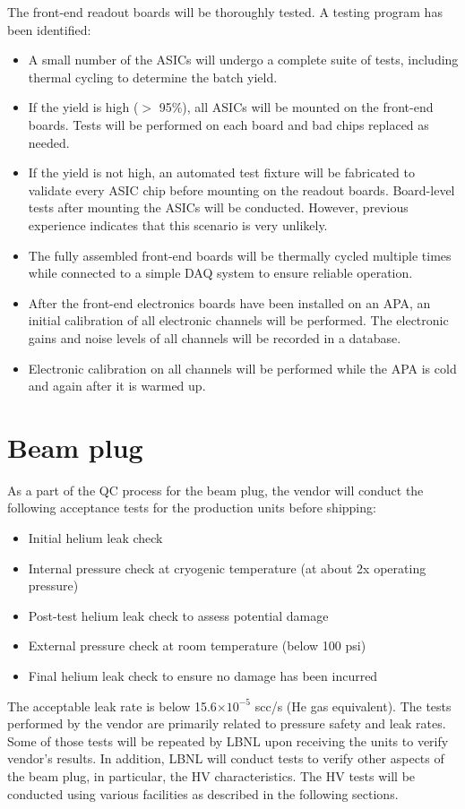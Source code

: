 The front-end readout boards will be thoroughly tested. A testing program has been identified:
\begin{itemize}
\item A small number of the ASICs will undergo a complete suite 
of tests, including thermal cycling to determine the batch yield.
\item If the yield is high ($>$ 95\%), all ASICs will be mounted 
on the front-end boards.
Tests will be performed on each board and bad chips replaced as needed.
\item If the yield is not high, an automated test fixture will be 
fabricated to validate every ASIC chip before mounting on the readout boards.
Board-level tests after mounting the ASICs will be conducted.
However, previous experience indicates that this scenario is very unlikely.
\item The fully assembled front-end boards will be thermally cycled multiple times while connected
to a simple DAQ system to ensure reliable operation.
\item After the front-end electronics boards have been installed on an APA,
an initial calibration of all electronic channels will be performed.
The electronic gains and noise levels of all channels will be recorded in a database.
\item Electronic calibration on all channels will be performed while the APA is cold and again after it is warmed up.
\end{itemize}

\section{Beam plug}

As a part of the QC process for the beam plug, the vendor will conduct the following acceptance tests for the production units before shipping:
\begin{itemize}
\item {Initial helium leak check}
\item {Internal pressure check at cryogenic temperature (at about 2x operating pressure)}
\item {Post-test helium leak check to assess potential damage}
\item {External pressure check at room temperature (below 100 psi)}
\item {Final helium leak check to ensure no damage has been incurred}
\end{itemize}
The acceptable leak rate is below 15.6$\times 10^{-5}$ scc/s (He gas equivalent).
The tests performed by the vendor are primarily related to pressure safety and leak rates. Some of those tests will be repeated by LBNL upon receiving the units to verify vendor's results. In addition, LBNL will conduct tests to verify other aspects of the beam plug, in particular, the HV characteristics. The HV tests will be conducted using various facilities as described in the following sections.


